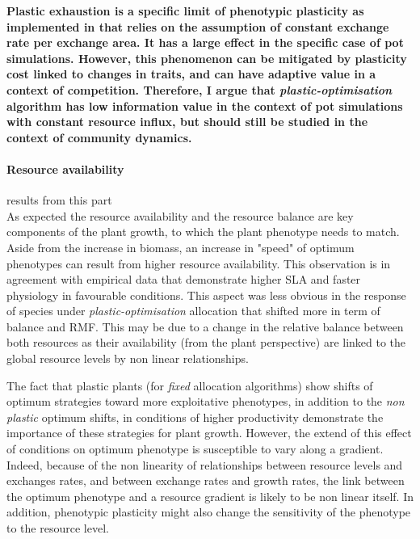 \textbf{Plastic exhaustion is a specific limit of phenotypic plasticity as implemented in \model that relies on the assumption of constant exchange rate per exchange area. It has a large effect in the specific case of pot simulations. However, this phenomenon can be mitigated by plasticity cost linked to changes in traits, and can have adaptive value in a context of competition. Therefore, I argue that \textit{plastic-optimisation} algorithm  has low information value in the context of pot simulations with constant resource influx, but should still be studied in the context of community dynamics.}

%
%

\paragraph{Resource availability}

results from this part\\
As expected the resource availability and the resource balance are key components of the plant growth, to which the plant phenotype needs to match. Aside from the increase in biomass, an increase in "speed" of optimum phenotypes can result from higher resource availability. This observation is in agreement with empirical data that demonstrate higher SLA and faster physiology in favourable conditions. This aspect was less obvious in the response of species under \textit{plastic-optimisation} allocation that shifted more in term of balance and RMF. This may be due to a change in the relative balance between both resources as their availability (from the plant perspective) are linked to the global resource levels by non linear relationships.

The fact that plastic plants (for \textit{fixed} allocation algorithms) show shifts of optimum strategies toward more exploitative phenotypes, in addition to the \textit{non plastic} optimum shifts, in conditions of higher productivity demonstrate the importance of these strategies for plant growth. However, the extend of this effect of conditions on optimum phenotype is susceptible to vary along a gradient. Indeed, because of the non linearity of relationships between resource levels and exchanges rates, and between exchange rates and growth rates, the link between the optimum phenotype and a resource gradient is likely to be non linear itself. In addition, phenotypic plasticity might also change the sensitivity of the phenotype to the resource level.

